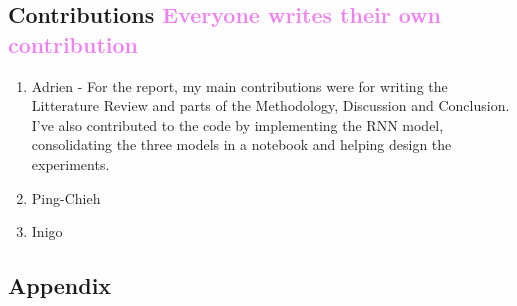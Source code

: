 \documentclass[12pt, letterpaper]{article}
\begin{document}
\subsection*{Contributions \textcolor{violet}{Everyone writes their own contribution}}
\begin{enumerate}
    \item Adrien - 
        For the report, my main contributions were for writing the Litterature Review and parts of the Methodology, Discussion and Conclusion. I've also contributed to the code by implementing the RNN model, consolidating the three models in a notebook and helping design the experiments.
    \item Ping-Chieh
    \item Inigo
\end{enumerate}

\pagebreak
\subsection*{Appendix}
\printbibliography
\end{document}
